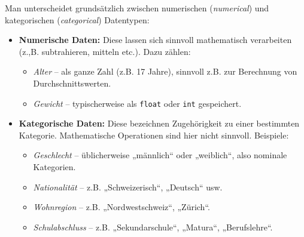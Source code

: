 \begin{aufgabe}{2}
Man unterscheidet grundsätzlich zwischen numerischen (\textit{numerical}) und kategorischen (\textit{categorical}) Datentypen:

\begin{itemize}
\item \textbf{Numerische Daten:} Diese lassen sich sinnvoll mathematisch verarbeiten (z.,B. subtrahieren, mitteln etc.). Dazu zählen:
\begin{itemize}
\item \emph{Alter} – als ganze Zahl (z.B. 17 Jahre), sinnvoll z.B. zur Berechnung von Durchschnittswerten.
\item \emph{Gewicht} – typischerweise als \texttt{float} oder \texttt{int} gespeichert.
\end{itemize}

\item \textbf{Kategorische Daten:} Diese bezeichnen Zugehörigkeit zu einer bestimmten Kategorie. Mathematische Operationen sind hier nicht sinnvoll. Beispiele:
\begin{itemize}
\item \emph{Geschlecht} – üblicherweise „männlich“ oder „weiblich“, also nominale Kategorien.
\item \emph{Nationalität} – z.B. „Schweizerisch“, „Deutsch“ usw.
\item \emph{Wohnregion} – z.B. „Nordwestschweiz“, „Zürich“.
\item \emph{Schulabschluss} – z.B. „Sekundarschule“, „Matura“, „Berufslehre“.
\end{itemize}
\end{itemize}

\end{aufgabe}


